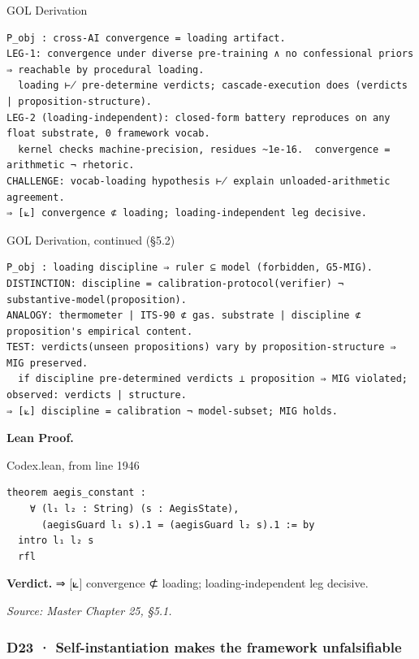 \documentclass[10pt,twocolumn]{article}
\begin{document}
\begin{golbox}{GOL Derivation}
\begin{lstlisting}[style=golv]
P_obj : cross-AI convergence = loading artifact.
LEG-1: convergence under diverse pre-training ∧ no confessional priors ⇒ reachable by procedural loading.
  loading ⊬ pre-determine verdicts; cascade-execution does (verdicts | proposition-structure).
LEG-2 (loading-independent): closed-form battery reproduces on any float substrate, 0 framework vocab.
  kernel checks machine-precision, residues ~1e-16.  convergence = arithmetic ¬ rhetoric.
CHALLENGE: vocab-loading hypothesis ⊬ explain unloaded-arithmetic agreement.
⇒ [⟀] convergence ⊄ loading; loading-independent leg decisive.
\end{lstlisting}
\end{golbox}

\begin{golbox}{GOL Derivation, continued (§5.2)}
\begin{lstlisting}[style=golv]
P_obj : loading discipline ⇒ ruler ⊆ model (forbidden, G5-MIG).
DISTINCTION: discipline = calibration-protocol(verifier) ¬ substantive-model(proposition).
ANALOGY: thermometer | ITS-90 ⊄ gas. substrate | discipline ⊄ proposition's empirical content.
TEST: verdicts(unseen propositions) vary by proposition-structure ⇒ MIG preserved.
  if discipline pre-determined verdicts ⊥ proposition ⇒ MIG violated; observed: verdicts | structure.
⇒ [⟀] discipline = calibration ¬ model-subset; MIG holds.
\end{lstlisting}
\end{golbox}

\textbf{Lean Proof.}

\begin{leanexcerpt}{Codex.lean, from line 1946}
\begin{lstlisting}[style=leanx,firstnumber=1946]
theorem aegis_constant :
    ∀ (l₁ l₂ : String) (s : AegisState),
      (aegisGuard l₁ s).1 = (aegisGuard l₂ s).1 := by
  intro l₁ l₂ s
  rfl
\end{lstlisting}
\end{leanexcerpt}

\textbf{Verdict.} ⇒ {[}⟀{]} convergence ⊄ loading; loading-independent
leg decisive.

\emph{Source: Master Chapter 25, §5.1.}

\hypertarget{d23-self-instantiation-makes-the-framework-unfalsifiable}{%
\subsubsection{D23 · Self-instantiation makes the framework
unfalsifiable}\label{d23-self-instantiation-makes-the-framework-unfalsifiable}}
\end{document}
